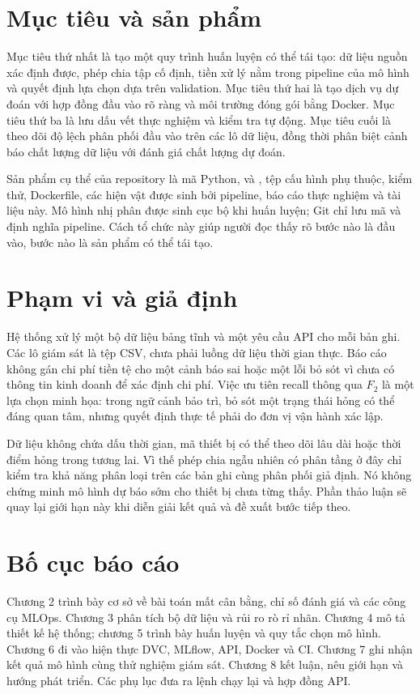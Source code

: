 \section{Mục tiêu và sản phẩm}
Mục tiêu thứ nhất là tạo một quy trình huấn luyện có thể tái tạo: dữ liệu nguồn xác định được, phép chia tập cố định, tiền xử lý nằm trong pipeline của mô hình và quyết định lựa chọn dựa trên validation. Mục tiêu thứ hai là tạo dịch vụ dự đoán với hợp đồng đầu vào rõ ràng và môi trường đóng gói bằng Docker. Mục tiêu thứ ba là lưu dấu vết thực nghiệm và kiểm tra tự động. Mục tiêu cuối là theo dõi độ lệch phân phối đầu vào trên các lô dữ liệu, đồng thời phân biệt cảnh báo chất lượng dữ liệu với đánh giá chất lượng dự đoán.

Sản phẩm cụ thể của repository là mã Python,  và , tệp cấu hình phụ thuộc, kiểm thử, Dockerfile, các hiện vật được sinh bởi pipeline, báo cáo thực nghiệm và tài liệu này. Mô hình nhị phân  được sinh cục bộ khi huấn luyện; Git chỉ lưu mã và định nghĩa pipeline. Cách tổ chức này giúp người đọc thấy rõ bước nào là đầu vào, bước nào là sản phẩm có thể tái tạo.

\section{Phạm vi và giả định}
Hệ thống xử lý một bộ dữ liệu bảng tĩnh và một yêu cầu API cho mỗi bản ghi. Các lô giám sát là tệp CSV, chưa phải luồng dữ liệu thời gian thực. Báo cáo không gán chi phí tiền tệ cho một cảnh báo sai hoặc một lỗi bỏ sót vì chưa có thông tin kinh doanh để xác định chi phí. Việc ưu tiên recall thông qua $F_2$ là một lựa chọn minh họa: trong ngữ cảnh bảo trì, bỏ sót một trạng thái hỏng có thể đáng quan tâm, nhưng quyết định thực tế phải do đơn vị vận hành xác lập.

Dữ liệu không chứa dấu thời gian, mã thiết bị có thể theo dõi lâu dài hoặc thời điểm hỏng trong tương lai. Vì thế phép chia ngẫu nhiên có phân tầng ở đây chỉ kiểm tra khả năng phân loại trên các bản ghi cùng phân phối giả định. Nó không chứng minh mô hình dự báo sớm cho thiết bị chưa từng thấy. Phần thảo luận sẽ quay lại giới hạn này khi diễn giải kết quả và đề xuất bước tiếp theo.

\section{Bố cục báo cáo}
Chương 2 trình bày cơ sở về bài toán mất cân bằng, chỉ số đánh giá và các công cụ MLOps. Chương 3 phân tích bộ dữ liệu và rủi ro rò rỉ nhãn. Chương 4 mô tả thiết kế hệ thống; chương 5 trình bày huấn luyện và quy tắc chọn mô hình. Chương 6 đi vào hiện thực DVC, MLflow, API, Docker và CI. Chương 7 ghi nhận kết quả mô hình cùng thử nghiệm giám sát. Chương 8 kết luận, nêu giới hạn và hướng phát triển. Các phụ lục đưa ra lệnh chạy lại và hợp đồng API.

